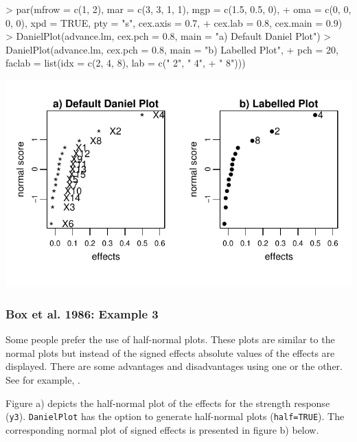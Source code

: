 \documentclass[letterpaper]{article}
\begin{document}
\begin{center}
\begin{Schunk}
\begin{Sinput}
> par(mfrow = c(1, 2), mar = c(3, 3, 1, 1), mgp = c(1.5, 0.5, 0), 
+     oma = c(0, 0, 0, 0), xpd = TRUE, pty = "s", cex.axis = 0.7, 
+     cex.lab = 0.8, cex.main = 0.9)
> DanielPlot(advance.lm, cex.pch = 0.8, main = "a) Default Daniel Plot")
> DanielPlot(advance.lm, cex.pch = 0.8, main = "b) Labelled Plot", 
+     pch = 20, faclab = list(idx = c(2, 4, 8), lab = c(" 2", " 4", 
+         " 8")))
\end{Sinput}
\end{Schunk}
\includegraphics{BsMD-DanielPlots}
\end{center}

\subsubsection{Box et al. 1986: Example 3}

Some people prefer the use of half-normal plots. These plots are similar to
the normal plots but instead of the signed effects absolute values of the
effects are displayed. There are some advantages and disadvantages using one
or the other. See for example, \citet[chap.~7.6]{Daniel-1976}.

Figure a) depicts the half-normal plot of the effects for the strength
response (\texttt{y3}). \texttt{DanielPlot} has the option to generate
half-normal plots (\texttt{half=TRUE}). The corresponding normal plot of
signed effects is presented in figure b) below.
\end{document}
